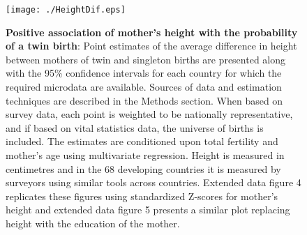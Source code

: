 \documentclass{nature}
\begin{document}
\begin{linenumbers}
\clearpage
\thispagestyle{empty}

\clearpage

\begin{spacing}{1}
\begin{figure}[htpb!]
  \texttt{[image: ./HeightDif.eps]}
\vspace{5mm}
\caption{\textbf{Positive association of mother's height with the probability of a twin birth}: {\footnotesize Point estimates of the average difference in height between mothers of twin and singleton births are presented along with the 95\% confidence intervals for each country for which the required microdata are available. Sources of data and estimation techniques are described in the Methods section.  When based on survey data, each point is weighted to be nationally representative, and if based on vital statistics data, the universe of births is included. The estimates are conditioned upon total fertility and mother's age using multivariate regression. Height is measured in centimetres and in the 68 developing countries it is measured by surveyors using similar tools across countries. Extended data figure 4 replicates these figures using standardized Z-scores for mother's height and extended data figure 5 presents a similar plot replacing height with the education of the mother.}}
\label{fig:countryEsts}
\end{figure}




\end{spacing}
\end{linenumbers}
\end{document}
